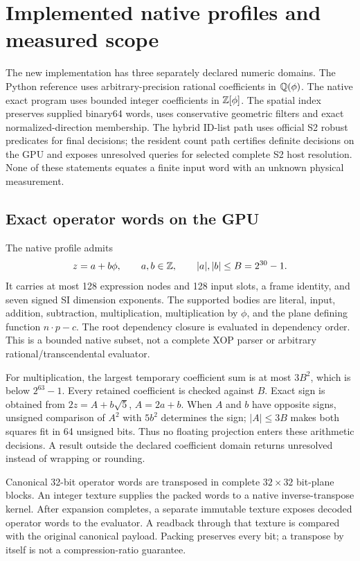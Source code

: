 \section{Implemented native profiles and measured scope}
\label{sec:r15-runtime}
The new implementation has three separately declared numeric domains. The
Python reference uses arbitrary-precision rational coefficients in
$\mathbb{Q}(\phi)$. The native exact program uses bounded integer coefficients in
$\mathbb Z[\phi]$. The spatial index preserves supplied binary64 words, uses
conservative geometric filters and exact normalized-direction membership.
The hybrid ID-list path uses official S2 robust predicates for final decisions;
the resident count path certifies definite decisions on the GPU and exposes
unresolved queries for selected complete S2 host resolution.
None of these statements equates a finite input word
with an unknown physical measurement.

\subsection{Exact operator words on the GPU}
The native profile  admits
\[
 z=a+b\phi,\qquad a,b\in\mathbb Z,\qquad |a|,|b|\le B=2^{30}-1.
\]
It carries at most 128 expression nodes and 128 input slots, a frame identity,
and seven signed SI dimension exponents. The supported bodies are literal,
input, addition, subtraction, multiplication, multiplication by $\phi$, and
the plane defining function $n\cdot p-c$. The root dependency closure is
evaluated in dependency order. This is a bounded native subset, not a complete
XOP parser or arbitrary rational/transcendental evaluator.

For multiplication, the largest temporary coefficient sum is at most $3B^2$,
which is below $2^{63}-1$. Every retained coefficient is checked against $B$.
Exact sign is obtained from $2z=A+b\sqrt5$, $A=2a+b$. When $A$ and $b$ have
opposite signs, unsigned comparison of $A^2$ with $5b^2$ determines the sign;
$|A|\le3B$ makes both squares fit in 64 unsigned bits. Thus no floating
projection enters these arithmetic decisions. A result outside the declared
coefficient domain returns unresolved instead of wrapping or rounding.

Canonical 32-bit operator words are transposed in complete $32\times32$
bit-plane blocks. An integer texture supplies the packed words to a native
inverse-transpose kernel. After expansion completes, a separate immutable
texture exposes decoded operator words to the evaluator. A readback through
that texture is compared with the original canonical payload. Packing preserves
every bit; a transpose by itself is not a compression-ratio guarantee.

